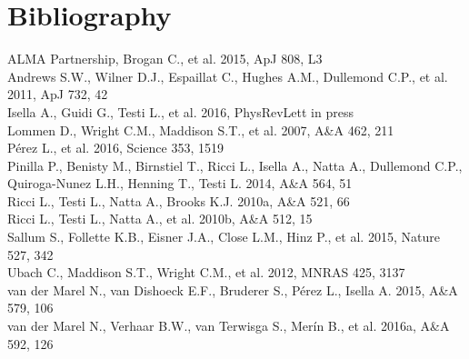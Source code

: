 \documentclass[10pt,fleqn,twoside]{article}
\begin{document}
% 
% 
% 

\section{Bibliography}

%
%


ALMA Partnership, Brogan C., et al. 2015, ApJ 808, L3\\
Andrews S.W., Wilner D.J., Espaillat C., Hughes A.M., Dullemond C.P., et al. 2011, ApJ 732, 42\\
Isella A., Guidi G., Testi L., et al. 2016, PhysRevLett in press\\
Lommen D., Wright C.M., Maddison S.T., et al. 2007, A\&A 462, 211\\
P\'{e}rez L., et al. 2016, Science 353, 1519\\
Pinilla P., Benisty M., Birnstiel T., Ricci L., Isella A., Natta A., Dullemond C.P., Quiroga-Nunez L.H., Henning T., Testi L. 2014, A\&A 564, 51\\
Ricci L., Testi L., Natta A., Brooks K.J. 2010a, A\&A 521, 66\\
Ricci L., Testi L., Natta A., et al. 2010b, A\&A 512, 15\\
Sallum S., Follette K.B., Eisner J.A., Close L.M., Hinz P., et al. 2015, Nature 527, 342\\
Ubach C., Maddison S.T., Wright C.M., et al. 2012, MNRAS 425, 3137\\
van der Marel N., van Dishoeck E.F., Bruderer S., P\'{e}rez L., Isella A. 2015, A\&A 579, 106\\
van der Marel N., Verhaar B.W., van Terwisga S., Mer\'{i}n B., et al. 2016a, A\&A 592, 126\\
\end{document}
